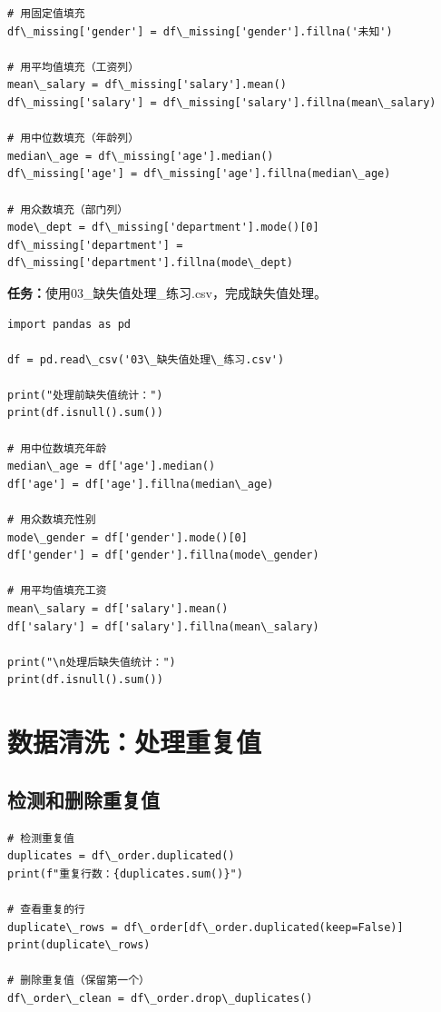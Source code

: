 \documentclass[12pt,a4paper]{article}
\begin{document}
\begin{lstlisting}[caption={填充缺失值的方法}]
# 用固定值填充
df\_missing['gender'] = df\_missing['gender'].fillna('未知')

# 用平均值填充（工资列）
mean\_salary = df\_missing['salary'].mean()
df\_missing['salary'] = df\_missing['salary'].fillna(mean\_salary)

# 用中位数填充（年龄列）
median\_age = df\_missing['age'].median()
df\_missing['age'] = df\_missing['age'].fillna(median\_age)

# 用众数填充（部门列）
mode\_dept = df\_missing['department'].mode()[0]
df\_missing['department'] = df\_missing['department'].fillna(mode\_dept)
\end{lstlisting}

\begin{practicebox}
\textbf{任务：}使用03\_缺失值处理\_练习.csv，完成缺失值处理。

\begin{lstlisting}
import pandas as pd

df = pd.read\_csv('03\_缺失值处理\_练习.csv')

print("处理前缺失值统计：")
print(df.isnull().sum())

# 用中位数填充年龄
median\_age = df['age'].median()
df['age'] = df['age'].fillna(median\_age)

# 用众数填充性别
mode\_gender = df['gender'].mode()[0]
df['gender'] = df['gender'].fillna(mode\_gender)

# 用平均值填充工资
mean\_salary = df['salary'].mean()
df['salary'] = df['salary'].fillna(mean\_salary)

print("\n处理后缺失值统计：")
print(df.isnull().sum())
\end{lstlisting}
\end{practicebox}

\section{数据清洗：处理重复值}

\subsection{检测和删除重复值}

\begin{lstlisting}[caption={处理重复值}]
# 检测重复值
duplicates = df\_order.duplicated()
print(f"重复行数：{duplicates.sum()}")

# 查看重复的行
duplicate\_rows = df\_order[df\_order.duplicated(keep=False)]
print(duplicate\_rows)

# 删除重复值（保留第一个）
df\_order\_clean = df\_order.drop\_duplicates()
\end{lstlisting}
\end{document}
